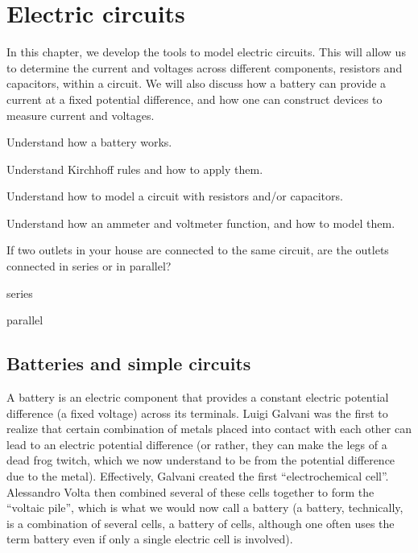 \chapter{Electric circuits}
\label{chapter:circuits}
In this chapter, we develop the tools to model electric circuits. This will allow us to determine the current and voltages across different components, resistors and capacitors, within a circuit. We will also discuss how a battery can provide a current at a fixed potential difference, and how one can construct devices to measure current and voltages.

\begin{learningObjectives}{
 \item Understand how a battery works.
 \item Understand Kirchhoff rules and how to apply them.
 \item Understand how to model a circuit with resistors and/or capacitors.
 \item Understand how an ammeter and voltmeter function, and how to model them.
 }
\end{learningObjectives}

\begin{opening}
\begin{MCquestion}{If two outlets in your house are connected to the same circuit, are the outlets connected in series or in parallel?}
\item series
\item parallel \correct
\end{MCquestion}
\end{opening}

\section{Batteries and simple circuits}
\label{sec:circuits:batteries}
A battery is an electric component that provides a constant electric potential difference (a fixed voltage) across its terminals. Luigi Galvani was the first to realize that certain combination of metals placed into contact with each other can lead to an electric potential difference (or rather, they can make the legs of a dead frog twitch, which we now understand to be from the potential difference due to the metal). Effectively, Galvani created the first ``electrochemical cell''. Alessandro Volta then combined several of these cells together to form the ``voltaic pile'', which is what we would now call a battery (a battery, technically, is a combination of several cells, a battery of cells, although one often uses the term battery even if only a single electric cell is involved). 

